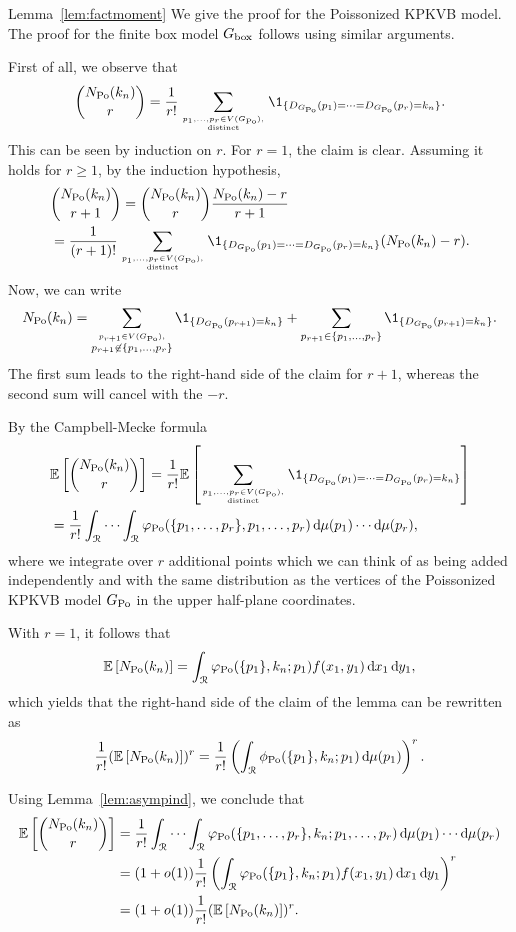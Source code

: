 \begin{proofof}{Lemma~\ref{lem:factmoment}}
We give the proof for the Poissonized KPKVB model. The proof for the finite box model $G_{\mathrm{box}}$ follows using similar arguments.

First of all, we observe that
\begin{align*}
{N_{\Po}(k_n) \choose r} = \frac{1}{r!} \sum_{p_1,\dots,p_r\in V(\GPo), \atop \text{distinct}} \1_{\{D_{\GPo}(p_1)=\dots=D_{\GPo}(p_r)=k_n\}}.
\end{align*}
This can be seen by induction on $r$. For $r=1$, the claim is clear. Assuming it holds for $r\geq 1$, by the induction hypothesis,
\begin{align*}
&{N_{\Po}(k_n) \choose r+1} = {N_{\Po}(k_n) \choose r} \frac{N_{\Po}(k_n)-r}{r+1} \\
&= \frac{1}{(r+1)!}\sum_{p_1,\dots,p_r\in V(\GPo), \atop \text{distinct}} \1_{\{D_{\GPo}(p_1)=\dots=D_{\GPo}(p_r)=k_n\}} (N_{\Po}(k_n)-r).
\end{align*}
Now, we can write
\[
	N_{\Po}(k_n) = \sum_{\stackrel{p_{r+1} \in V(\GPo),}{p_{r+1} \not \in\{ p_1,\dots,p_r\}} } \1_{\{D_{\GPo}(p_{r+1})=k_n\}}+\sum_{p_{r+1} \in \{p_1,\dots,p_r\}}\1_{\{D_{\GPo}(p_{r+1})=k_n\}}.
\]
The first sum leads to the right-hand side of the claim for $r+1$, whereas the second sum will cancel with the $-r$.

By the Campbell-Mecke formula 
\begin{align*}
	&\Exp{ {N_{\Po}(k_n) \choose r}}=\frac{1}{r!} \E\left[ \sum_{p_1,\dots,p_r\in V(\GPo), \atop \text{distinct}}  
		\1_{\{D_{\GPo}(p_1)=\dots=D_{\GPo}(p_r)=k_n\}}\right] \\
	&=\frac{1}{r!} \int_\Rcal \cdots \int_\Rcal \varphi_{\Po}(\{p_1,\dots,p_r\},p_1,\dots,p_r)
		\dd \mu(p_1) \cdots \dd \mu(p_{r}),
\end{align*}
where we integrate over $r$ additional points which we can think of as being added independently and with the same distribution as the vertices of the Poissonized KPKVB model $G_{{\mathrm{Po}}}$ in the upper half-plane coordinates.

With $r=1$, it follows that
\[
	\mathbb{E}\left[N_{{\mathrm{Po}}}(k_n)\right] = \int_{{\mathcal R}} \varphi_{{\mathrm{Po}}}(\{p_1\}, k_n ; p_1) f(x_1,y_1) \operatorname{\mathrm{d}\hspace{-2pt}} x_1 \operatorname{\mathrm{d}\hspace{-2pt}} y_1,
\]
which yields that the right-hand side of the claim of the lemma can be rewritten as
\[
	\frac{1}{r!}(\mathbb{E}\left[N_{{\mathrm{Po}}}(k_n)\right])^r = \frac{1}{r!}\left(\int_{{\mathcal R}} \phi_{{\mathrm{Po}}}(\{p_1\}, k_n; p_1) \operatorname{\mathrm{d}\hspace{-2pt}} \mu(p_1)\right)^r.
\]

Using Lemma~\ref{lem:asympind}, we conclude that
\begin{align*}
	\mathbb{E}\left[ { N_{{\mathrm{Po}}}(k_n) \choose r}\right] 
	&= \frac{1}{r!} \int_{{\mathcal R}} \cdots \int_{{\mathcal R}} 
		\varphi_{{\mathrm{Po}}}(\{p_1,\dots,p_r\}, k_n; p_1,\dots,p_r) 
		\operatorname{\mathrm{d}\hspace{-2pt}} \mu(p_1) \cdots \operatorname{\mathrm{d}\hspace{-2pt}} \mu(p_{r}) \\
	&= (1+o(1))\frac{1}{r!}\left(\int_{{\mathcal R}} \varphi_{{\mathrm{Po}}}(\{p_1\}, k_n;p_1) f(x_1,y_1) \operatorname{\mathrm{d}\hspace{-2pt}} x_1 \operatorname{\mathrm{d}\hspace{-2pt}} y_1 \right)^r \\
	&= (1+o(1))\frac{1}{r!}(\mathbb{E}\left[N_{{\mathrm{Po}}}(k_n)\right])^r.
\end{align*}
\end{proofof}

